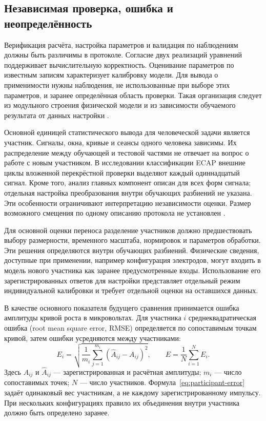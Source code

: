 \subsection{Независимая проверка, ошибка и неопределённость}

Верификация расчёта, настройка параметров и валидация по наблюдениям должны быть различимы в протоколе. Согласие двух реализаций уравнений поддерживает вычислительную корректность. Оценивание параметров по известным записям характеризует калибровку модели. Для вывода о применимости нужны наблюдения, не использованные при выборе этих параметров, и заранее определённая область проверки. Такая организация следует из модульного строения физической модели и из зависимости обучаемого результата от данных настройки \cite{s285,ecapmodel}.

Основной единицей статистического вывода для человеческой задачи является участник. Сигналы, окна, кривые и сеансы одного человека зависимы. Их распределение между обучающей и тестовой частями не отвечает на вопрос о работе с новым участником. В исследовании классификации ECAP внешние циклы вложенной перекрёстной проверки выделяют каждый одиннадцатый сигнал. Кроме того, анализ главных компонент описан для всех форм сигнала; отдельная настройка преобразования внутри обучающих разбиений не указана. Эти особенности ограничивают интерпретацию независимости оценки. Размер возможного смещения по одному описанию протокола не установлен \cite{s105}.

Для основной оценки переноса разделение участников должно предшествовать выбору размерности, временного масштаба, нормировок и параметров обработки. Эти решения определяются внутри обучающих разбиений. Физические сведения, доступные при применении, например конфигурация электродов, могут входить в модель нового участника как заранее предусмотренные входы. Использование его зарегистрированных ответов для настройки представляет отдельный режим индивидуальной калибровки и требует отдельной оценки на оставшихся данных.

В качестве основного показателя будущего сравнения принимается ошибка амплитуды кривой роста в микровольтах. Для участника $i$ среднеквадратическая ошибка (root mean square error, RMSE) определяется по сопоставимым точкам кривой, затем ошибки усредняются между участниками:
\begin{equation}
 E_i=\sqrt{\frac{1}{m_i}\sum_{j=1}^{m_i}
       (\widehat A_{ij}-A_{ij})^2}, \qquad
 E=\frac{1}{N}\sum_{i=1}^{N}E_i.
 \label{eq:participant-error}
\end{equation}
Здесь $A_{ij}$ и $\widehat A_{ij}$ --- зарегистрированная и расчётная амплитуды; $m_i$ --- число сопоставимых точек; $N$ --- число участников. Формула~\eqref{eq:participant-error} задаёт одинаковый вес участникам, а не каждому зарегистрированному импульсу. При нескольких конфигурациях правило их объединения внутри участника должно быть определено заранее.


